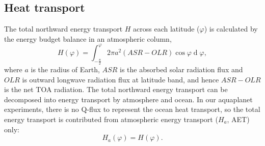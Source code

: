 \subsection{Heat transport} \label{sec:heat_transport}

 
The total northward energy transport $H$ across each latitude ($\varphi$) is calculated by the energy budget balance in an atmospheric column,
\begin{equation}
	H(\varphi) =  \int_{-\frac{\pi}{2}}^{\varphi}2\pi a^2(ASR-OLR)\operatorname{cos}\varphi \operatorname{d}\varphi,
\end{equation}  
where $a$ is the radius of Earth, $ASR$ is the absorbed solar radiation flux and $OLR$ is outward longwave radiation flux at latitude band, and hence $ASR-OLR$ is the net TOA radiation. The total northward energy transport can be decomposed into energy transport by atmosphere and ocean. In our aquaplanet experiments, there is no Q-flux to represent the ocean heat transport, so the total energy transport is contributed from atmospheric energy transport ($H_{a}$, AET) only:
\begin{equation}
	H_a(\varphi) =  H(\varphi).
\end{equation}

